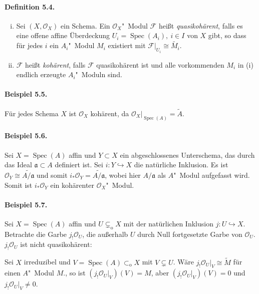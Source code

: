 \documentclass[11pt,b5paper,openany]{memoir}
\begin{document}
\paragraph{Definition 5.4.}\label{5.4} \begin{enumerate}[(i)]
\item Sei $(X,\mathcal{O}_X)$ ein Schema. Ein $\mathcal{O}_X$"~Modul $\mathcal{F}$ heißt \textit{quasikohärent}, falls es eine offene affine Überdeckung $U_i=\operatorname{Spec}(A_i),\ i\in I$ von $X$ gibt, so dass für jedes $i$ ein $A_i$"~Modul $M_i$ existiert mit $\mathcal{F}|_{U_i}\cong\widetilde{M_i}$.
\item $\mathcal{F}$ heißt \textit{kohärent}, falls $\mathcal{F}$ quasikohärent ist und alle vorkommenden $M_i$ in (i) endlich erzeugte $A_i$"~Moduln sind.
\end{enumerate}

\paragraph{Beispiel 5.5.}\label{5.5} Für jedes Schema $X$ ist $\mathcal{O}_X$ kohärent, da $\mathcal{O}_X|_{\operatorname{Spec}(A)}=\widetilde{A}$.

\paragraph{Beispiel 5.6.}\label{5.6} Sei $X=\operatorname{Spec}(A)$ affin und $Y\subset X$ ein abgeschlossenes Unterschema, das durch das Ideal $\mathfrak{a}\subset A$ definiert ist. Sei $i:Y\hookrightarrow X$ die natürliche Inklusion. Es ist $\mathcal{O}_Y\cong\widetilde{A/\mathfrak{a}}$ und somit $i_\ast\mathcal{O}_Y=\widetilde{A/\mathfrak{a}}$, wobei hier $A/\mathfrak{a}$ als $A$"~Modul aufgefasst wird. Somit ist $i_\ast\mathcal{O}_Y$ ein kohärenter $\mathcal{O}_X$"~Modul.

\paragraph{Beispiel 5.7.}\label{5.7} Sei $X=\operatorname{Spec}(A)$ affin und $U\subsetneq_\text{o}X$ mit der natürlichen Inklusion $j:U\hookrightarrow X$. Betrachte die Garbe $j_!\mathcal{O}_U$, die außerhalb $U$ durch Null fortgesetzte Garbe von $\mathcal{O}_U$. $j_!\mathcal{O}_U$ ist nicht quasikohärent:

Sei $X$ irreduzibel und $V=\operatorname{Spec}(A)\subset_\text{o}X$ mit $V\subsetneq U$. Wäre $j_!\mathcal{O}_U|_V\cong\widetilde{M}$ für einen $A$"~Modul $M$., so ist $(j_!\mathcal{O}_U|_V)(V)=M$, aber $(j_!\mathcal{O}_U|_V)(V)=0$ und $j_!\mathcal{O}_U|_V\neq 0$.
\end{document}
